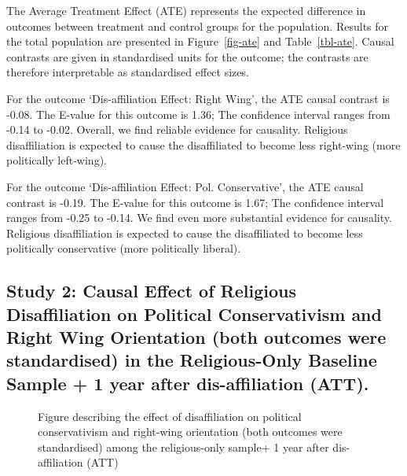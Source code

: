 \documentclass[
  singlecolumn]{article}
\begin{document}
\begin{table}

\caption{\label{tbl-ate}}

\centering{

\captionsetup{labelsep=none}

}

\end{table}%

The Average Treatment Effect (ATE) represents the expected difference in
outcomes between treatment and control groups for the population.
Results for the total population are presented in Figure~\ref{fig-ate}
and Table~\ref{tbl-ate}. Causal contrasts are given in standardised
units for the outcome; the contrasts are therefore interpretable as
standardised effect sizes.

For the outcome `Dis-affiliation Effect: Right Wing', the ATE causal
contrast is -0.08. The E-value for this outcome is 1.36; The confidence
interval ranges from -0.14 to -0.02. Overall, we find reliable evidence
for causality. Religious disaffiliation is expected to cause the
disaffiliated to become less right-wing (more politically left-wing).

For the outcome `Dis-affiliation Effect: Pol. Conservative', the ATE
causal contrast is -0.19. The E-value for this outcome is 1.67; The
confidence interval ranges from -0.25 to -0.14. We find even more
substantial evidence for causality. Religious disaffiliation is expected
to cause the disaffiliated to become less politically conservative (more
politically liberal).

\newpage{}

\subsection{Study 2: Causal Effect of Religious Disaffiliation on
Political Conservativism and Right Wing Orientation (both outcomes were
standardised) in the Religious-Only Baseline Sample + 1 year after
dis-affiliation
(ATT).}\label{study-2-causal-effect-of-religious-disaffiliation-on-political-conservativism-and-right-wing-orientation-both-outcomes-were-standardised-in-the-religious-only-baseline-sample-1-year-after-dis-affiliation-att.}

\begin{figure}


\caption{\label{fig-att}Figure describing the effect of disaffiliation
on political conservativism and right-wing orientation (both outcomes
were standardised) among the religious-only sample+ 1 year after
dis-affiliation (ATT)}

\end{figure}%
\end{document}
